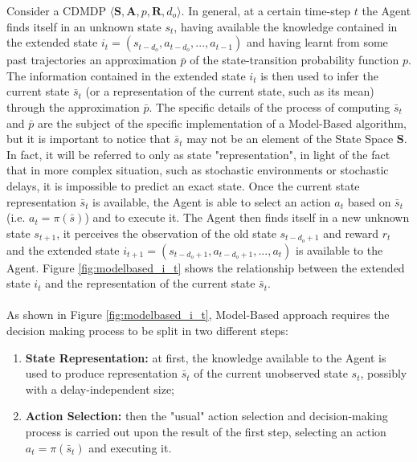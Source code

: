                 Consider a CDMDP $\langle \mathbf{S}, \mathbf{A}, p, \mathbf{R}, d_o\rangle$. In general, at a certain time-step $t$ the Agent finds itself in an unknown state $s_t$, having available the knowledge contained in the extended state $i_t = \left( s_{t-d_{o}}, a_{t-d_{o}}, ..., a_{t-1}\right)$ and having learnt from some past trajectories an approximation $\bar{p}$ of the state-transition probability function $p$. The information contained in the extended state $i_t$ is then used to infer the current state $\bar{s}_t$ (or a representation of the current state, such as its mean) through the approximation $\bar{p}$. The specific details of the process of computing $\bar{s}_t$ and $\bar{p}$ are the subject of the specific implementation of a Model-Based algorithm, but it is important to notice that $\bar{s}_t$ may not be an element of the State Space $\mathbf{S}$. In fact, it will be referred to only as state "representation", in light of the fact that in more complex situation, such as stochastic environments or stochastic delays, it is impossible to predict an exact state. Once the current state representation $\bar{s}_t$ is available, the Agent is able to select an action $a_t$ based on $\bar{s}_t$ (i.e. $a_t = \pi\left(\bar{s}\right)$) and to execute it. The Agent then finds itself in a new unknown state $s_{t+1}$, it perceives the observation of the old state $s_{t-d_{o}+1}$ and reward $r_t$ and the extended state $i_{t+1} = \left( s_{t-d_{o}+1}, a_{t-d_{o}+1}, ..., a_{t}\right)$ is available to the Agent. Figure \ref{fig:modelbased_i_t} shows the relationship between the extended state $i_t$ and the representation of the current state $\bar{s}_t$.
                \\\\
                As shown in Figure \ref{fig:modelbased_i_t}, Model-Based approach requires the decision making process to be split in two different steps:
                \begin{enumerate}
                    \item\textbf{State Representation:} at first, the knowledge available to the Agent is used to produce representation $\bar{s}_t$ of the current unobserved state $s_t$, possibly with a delay-independent size; 
                    \item\textbf{Action Selection:} then the "usual" action selection and decision-making process is carried out upon the result of the first step, selecting an action $a_t = \pi(\bar{s}_t)$ and executing it.
                \end{enumerate}
